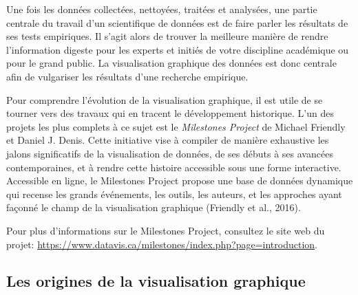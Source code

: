 \documentclass[
  letterpaper,
  DIV=11,
  numbers=noendperiod]{scrreprt}
\begin{document}
Une fois les données collectées, nettoyées, traitées et analysées, une
partie centrale du travail d'un scientifique de données est de faire
parler les résultats de ses tests empiriques. Il s'agit alors de trouver
la meilleure manière de rendre l'information digeste pour les experts et
initiés de votre discipline académique ou pour le grand public. La
visualisation graphique des données est donc centrale afin de vulgariser
les résultats d'une recherche empirique.

Pour comprendre l'évolution de la visualisation graphique, il est utile
de se tourner vers des travaux qui en tracent le développement
historique. L'un des projets les plus complets à ce sujet est le
\emph{Milestones Project} de Michael Friendly et Daniel J. Denis. Cette
initiative vise à compiler de manière exhaustive les jalons
significatifs de la visualisation de données, de ses débuts à ses
avancées contemporaines, et à rendre cette histoire accessible sous une
forme interactive. Accessible en ligne, le Milestones Project propose
une base de données dynamique qui recense les grands événements, les
outils, les auteurs, et les approches ayant façonné le champ de la
visualisation graphique (Friendly et al., 2016).

\begin{tcolorbox}[enhanced jigsaw, opacityback=0, rightrule=.15mm, colback=white, colframe=quarto-callout-note-color-frame, left=2mm, title=\textcolor{quarto-callout-note-color}{\faInfo}\hspace{0.5em}{Note}, bottomtitle=1mm, colbacktitle=quarto-callout-note-color!10!white, breakable, arc=.35mm, coltitle=black, leftrule=.75mm, titlerule=0mm, toptitle=1mm, bottomrule=.15mm, toprule=.15mm, opacitybacktitle=0.6]

Pour plus d'informations sur le Milestones Project, consultez le site
web du projet:
\url{https://www.datavis.ca/milestones/index.php?page=introduction}.

\end{tcolorbox}

\hypertarget{les-origines-de-la-visualisation-graphique}{%
\subsection{Les origines de la visualisation
graphique}\label{les-origines-de-la-visualisation-graphique}}
\end{document}
